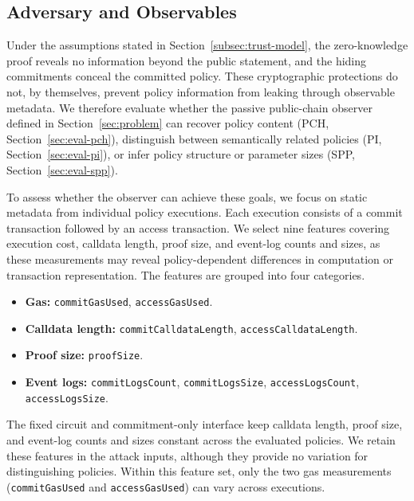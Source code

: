 \subsection{Adversary and Observables}
\label{sec:eval-threat}

Under the assumptions stated in Section~\ref{subsec:trust-model}, the zero-knowledge proof reveals no information beyond the public statement, and the hiding commitments conceal the committed policy.
These cryptographic protections do not, by themselves, prevent policy information from leaking through observable metadata.
We therefore evaluate whether the passive public-chain observer defined in Section~\ref{sec:problem} can recover policy content (PCH, Section~\ref{sec:eval-pch}), distinguish between semantically related policies (PI, Section~\ref{sec:eval-pi}), or infer policy structure or parameter sizes (SPP, Section~\ref{sec:eval-spp}).

To assess whether the observer can achieve these goals, we focus on static metadata from individual policy executions.
Each execution consists of a commit transaction followed by an access transaction.
We select nine features covering execution cost, calldata length, proof size, and event-log counts and sizes, as these measurements may reveal policy-dependent differences in computation or transaction representation.
The features are grouped into four categories.
%
\begin{itemize}
	\item \textbf{Gas:} \texttt{commitGasUsed}, \texttt{accessGasUsed}.
	\item \textbf{Calldata length:} \texttt{commitCalldataLength}, \texttt{accessCalldataLength}.
	\item \textbf{Proof size:} \texttt{proofSize}.
	\item \textbf{Event logs:} \texttt{commitLogsCount}, \texttt{commitLogsSize},
	      \texttt{accessLogsCount}, \texttt{accessLogsSize}.
\end{itemize}
%
The fixed circuit and commitment-only interface keep calldata length, proof size, and event-log counts and sizes constant across the evaluated policies.
We retain these features in the attack inputs, although they provide no variation for distinguishing policies.
Within this feature set, only the two gas measurements (\texttt{commitGasUsed} and \texttt{accessGasUsed}) can vary across executions.
